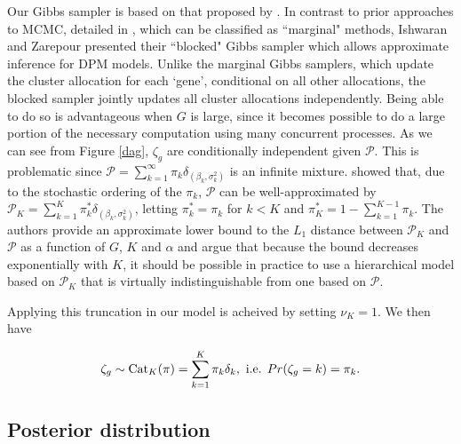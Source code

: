Our Gibbs sampler is based on that proposed by \citet{ishwaran2000}. In contrast to prior approaches to MCMC, detailed in \citet{neal2000}, which can be classified as ``marginal" methods, Ishwaran and Zarepour presented their ``blocked" Gibbs sampler which allows approximate inference for DPM models. Unlike the marginal Gibbs samplers, which update the cluster allocation for each
`gene', conditional on all other allocations, the blocked sampler jointly updates all cluster allocations independently. Being able to do so is advantageous when $G$ is large, since it becomes possible to do a large portion of the necessary computation using many concurrent processes. As we can see from Figure \ref{dag}, $\zeta_g$ are conditionally independent given $\mathcal{P}$. This is problematic since $\mathcal{P}=\sum_{k=1}^\infty \pi_k \delta_{(\beta_k,\sigma^2_k)}$ is an infinite mixture. \cite{ishwaran2001} showed that, due to the stochastic ordering of the $\pi_k$, $\mathcal{P}$ can be well-approximated by $\mathcal{P}_K=\sum_{k=1}^K \pi^*_k \delta_{(\beta_k,\sigma^2_k)}$, letting $\pi_k^*=\pi_k$ for $k<K$ and $\pi_K^* = 1-\sum_{k=1}^{K-1} \pi_k$. The authors provide an approximate lower bound to the $L_1$ distance between $\mathcal{P}_K$ and $\mathcal{P}$ as a function of $G$, $K$ and $\alpha$ and argue that because the bound decreases exponentially with $K$, it should be possible in practice to use a hierarchical model based on $\mathcal{P}_K$ that is virtually indistinguishable from one based on $\mathcal{P}$.

Applying this truncation in our model is acheived by setting $\nu_K=1$. We then have

\begin{equation*}
\zeta_g \sim \operatorname{Cat}_K(\pi) = \sum_{k=1}^K \pi_k \delta_{k}, \mbox{ i.e. } Pr(\zeta_g=k)=\pi_k.
\end{equation*}



\subsection{Posterior distribution}
\label{subsec:posterior}


